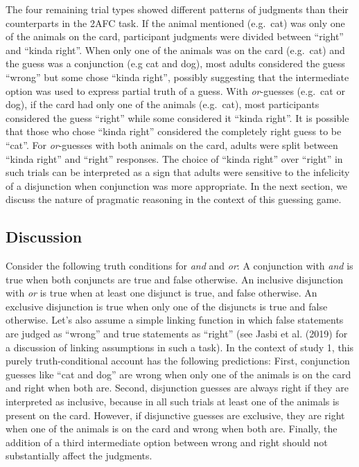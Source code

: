\documentclass[floatsintext,man]{apa6}
\theoremstyle{definition}
\theoremstyle{definition}
\theoremstyle{definition}
\theoremstyle{remark}
\begin{document}
The four remaining trial types showed different patterns of judgments
than their counterparts in the 2AFC task. If the animal mentioned
(e.g.~cat) was only one of the animals on the card, participant
judgments were divided between \enquote{right} and \enquote{kinda
right}. When only one of the animals was on the card (e.g.~cat) and the
guess was a conjunction (e.g cat and dog), most adults considered the
guess \enquote{wrong} but some chose \enquote{kinda right}, possibly
suggesting that the intermediate option was used to express partial
truth of a guess. With \emph{or}-guesses (e.g.~cat or dog), if the card
had only one of the animals (e.g.~cat), most participants considered the
guess \enquote{right} while some considered it \enquote{kinda right}. It
is possible that those who chose \enquote{kinda right} considered the
completely right guess to be \enquote{cat}. For \emph{or}-guesses with
both animals on the card, adults were split between \enquote{kinda
right} and \enquote{right} responses. The choice of \enquote{kinda
right} over \enquote{right} in such trials can be interpreted as a sign
that adults were sensitive to the infelicity of a disjunction when
conjunction was more appropriate. In the next section, we discuss the
nature of pragmatic reasoning in the context of this guessing game.

\subsection{Discussion}\label{discussion}

Consider the following truth conditions for \emph{and} and \emph{or}: A
conjunction with \emph{and} is true when both conjuncts are true and
false otherwise. An inclusive disjunction with \emph{or} is true when at
least one disjunct is true, and false otherwise. An exclusive
disjunction is true when only one of the disjuncts is true and false
otherwise. Let's also assume a simple linking function in which false
statements are judged as \enquote{wrong} and true statements as
\enquote{right} (see Jasbi et al. (2019) for a discussion of linking
assumptions in such a task). In the context of study 1, this purely
truth-conditional account has the following predictions: First,
conjunction guesses like \enquote{cat and dog} are wrong when only one
of the animals is on the card and right when both are. Second,
disjunction guesses are always right if they are interpreted as
inclusive, because in all such trials at least one of the animals is
present on the card. However, if disjunctive guesses are exclusive, they
are right when one of the animals is on the card and wrong when both
are. Finally, the addition of a third intermediate option between wrong
and right should not substantially affect the judgments.
\end{document}
